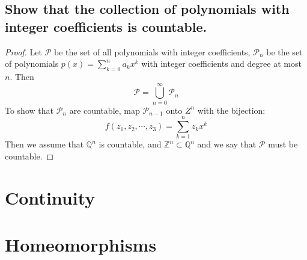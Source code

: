 \documentclass{article}
\theoremstyle{definition}
\begin{document}
    \subsection{Show that the collection of polynomials with integer coefficients is countable.}
        \begin{proof}
            Let $\mathcal{P}$ be the set of all polynomials with integer coefficients, $\mathcal{P}_n$ be the set of polynomials $p(x) = \sum_{k=0}^na_kx^k$ with integer coefficients and degree at most $n$. Then
            \[
                \mathcal{P} = \bigcup_{n=0}^\infty \mathcal{P}_n
            \]
            To show that $\mathcal{P}_n$ are countable, map $\mathcal{P}_{n-1}$ onto $Z^n$ with the bijection:
            \[
                f(z_1, z_2, \cdots, z_3) = \sum_{k=1}^n z_k x^k
            \]
            Then we assume that $\mathbb{Q}^n$ is countable, and $\mathbb{Z}^n \subset \mathbb{Q}^n$ and we say that $\mathcal{P}$ must be countable.
        \end{proof}
\section{Continuity}
\section{Homeomorphisms}
\end{document}
